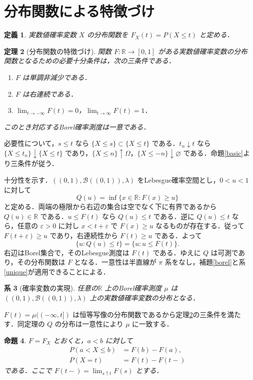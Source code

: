 \documentclass[a5paper,10pt,onecolumn]{jsarticle}
\makeatletter
\theoremstyle{mathnotetheorem}
\newtheorem{theorem}{定理}[section]
\newtheorem{definition}[theorem]{定義}
\newtheorem{proposition}[theorem]{命題}
\newtheorem{corollary}[theorem]{系}
\renewcommand{\proofname}{証明}
\renewenvironment{proof}[1][\proofname]{%
  \par\pushQED{\qed}\normalfont\topsep4\p@\@plus2\p@\relax
  \trivlist\item[\hskip\labelsep\bfseries #1]\ignorespaces
}{\popQED\endtrivlist\@endpefalse}
\newcommand{\R}{\mathbb{R}}
\newcommand{\B}{\mathcal B}
\newcommand{\1}{\mathbf{1}}
\makeatother
\begin{document}
\section{分布関数による特徴づけ}
\begin{definition}
実数値確率変数 $X$ の分布関数を $F_X(t)=P(X\le t)$ と定める．
\end{definition}
\begin{theorem}[分布関数の特徴づけ]\label{cdf}
関数 $F:\R\to[0,1]$ がある実数値確率変数の分布関数となるための必要十分条件は，次の三条件である．
\begin{enumerate}
\item $F$ は単調非減少である．
\item $F$ は右連続である．
\item $\lim_{t\to-\infty}F(t)=0$，$\lim_{t\to\infty}F(t)=1$．
\end{enumerate}
このとき対応するBorel確率測度は一意である．
\end{theorem}
\begin{proof}
必要性について，$s\le t$ なら $\{X\le s\}\subset\{X\le t\}$ である．$t_n\downarrow t$ なら $\{X\le t_n\}\downarrow\{X\le t\}$ であり，$\{X\le n\}\uparrow\Omega$，$\{X\le -n\}\downarrow\varnothing$ である．命題\ref{basic}より三条件が従う．

十分性を示す．$((0,1),\B((0,1)),\lambda)$ をLebesgue確率空間とし，$0<u<1$ に対して
\[
 Q(u)=\inf\{x\in\R:F(x)\ge u\}
\]
と定める．両端の極限から右辺の集合は空でなく下に有界であるから $Q(u)\in\R$ である．$u\le F(t)$ なら $Q(u)\le t$ である．逆に $Q(u)\le t$ なら，任意の $\varepsilon>0$ に対し $x<t+\varepsilon$ で $F(x)\ge u$ なるものが存在する．従って $F(t+\varepsilon)\ge u$ であり，右連続性から $F(t)\ge u$ である．よって
\[
 \{u:Q(u)\le t\}=\{u:u\le F(t)\}.
\]
右辺はBorel集合で，そのLebesgue測度は $F(t)$ である．ゆえに $Q$ は可測であり，その分布関数は $F$ となる．一意性は半直線が $\pi$ 系をなし，補題\ref{borel}と系\ref{unique}が適用できることによる．
\end{proof}
\begin{corollary}[確率変数の実現]
任意の$\R$ 上のBorel確率測度 $\mu$ は $((0,1),\B((0,1)),\lambda)$ 上の実数値確率変数の分布となる．
\end{corollary}
\begin{proof}
$F(t)=\mu(( -\infty,t])$ は恒等写像の分布関数であるから定理\ref{cdf}の三条件を満たす．同定理の $Q$ の分布は一意性により $\mu$ に一致する．
\end{proof}
\begin{proposition}
$F=F_X$ とおくと，$a<b$ に対して
\begin{align*}
 P(a<X\le b)&=F(b)-F(a),\\
 P(X=t)&=F(t)-F(t-)
\end{align*}
である．ここで $F(t-)=\lim_{s\uparrow t}F(s)$ とする．
\end{proposition}
\end{document}
